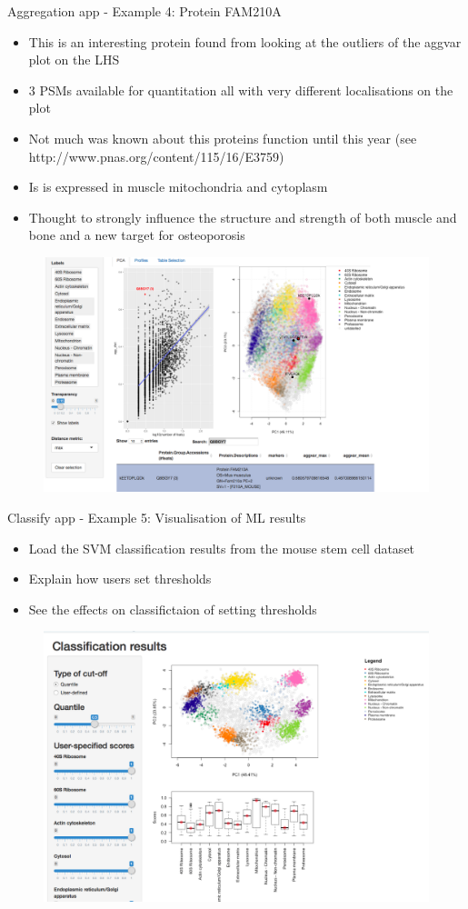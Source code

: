 \documentclass[bigger]{beamer}
\begin{document}
\begin{frame}{Aggregation app - Example 4: Protein FAM210A}
\smallskip
\footnotesize {
  \begin{itemize} 
  \item This is an interesting protein found from looking at the outliers of the aggvar plot on the LHS
  \item 3 PSMs available for quantitation all with very different localisations on the plot
  \item Not much was known about this proteins function until this year (see http://www.pnas.org/content/115/16/E3759)
  \item Is is expressed in muscle mitochondria and cytoplasm
  \item Thought to strongly influence the structure and strength of both muscle and bone and a new target for osteoporosis
  \end{itemize}
  }
  \begin{figure}
    \includegraphics[height=.4\linewidth]{Figures/agg-app.png}
  \end{figure}
\end{frame}


\begin{frame}{Classify app - Example 5: Visualisation of ML results}
\smallskip
\footnotesize {
  \begin{itemize} 
  \item Load the SVM classification results from the mouse stem cell dataset
  \item Explain how users set thresholds 
  \item See the effects on classifictaion of setting thresholds
    \end{itemize}
  }
  \begin{figure}
      \includegraphics[width=.7\linewidth]{Figures/classify-app.png}
  \end{figure}
\end{frame}
\end{document}
